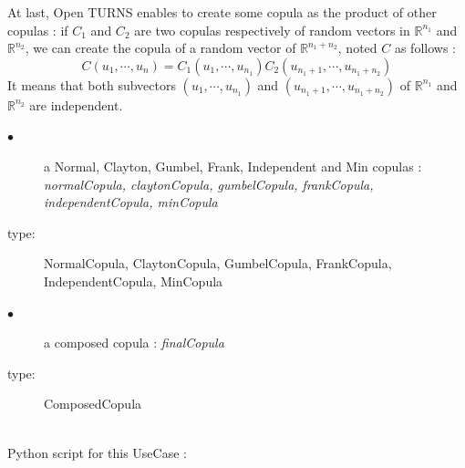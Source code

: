 At last, Open TURNS enables to create some copula as the product of other copulas : if $C_1$ and $C_2$ are two copulas respectively of random vectors in  $\mathbb{R}^{n_1}$ and $\mathbb{R}^{n_2}$, we can create the copula of a random vector of $\mathbb{R}^{n_1+n_2}$, noted $C$ as follows :
$$
C(u_1, \cdots, u_n) = C_1(u_1, \cdots, u_{n_1}) C_2(u_{n_1+1}, \cdots, u_{n_1+n_2})
$$
It means that both subvectors $(u_1, \cdots, u_{n_1})$ and $(u_{n_1+1}, \cdots, u_{n_1+n_2})$ of $\mathbb{R}^{n_1}$ and $\mathbb{R}^{n_2}$ are independent.\\


\noindent%
{
  \begin{description}
  \item[$\bullet$] a Normal, Clayton, Gumbel, Frank, Independent and Min copulas : {\itshape normalCopula, claytonCopula, gumbelCopula, frankCopula, independentCopula, minCopula}
  \item[type:] NormalCopula, ClaytonCopula, GumbelCopula, FrankCopula, IndependentCopula, MinCopula
  \item[$\bullet$] a composed copula : {\itshape finalCopula}
  \item[type:] ComposedCopula
  \end{description}
}

\textspace\\
Python script for this UseCase :


